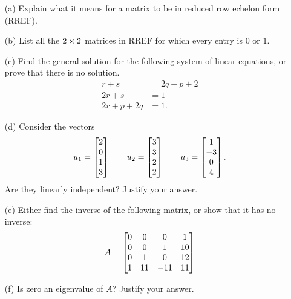 \documentclass[a4paper]{article}
\begin{document}
\begin{problem}[2012-13 resit]
\[ \]
 \begin{itemize}
  \item[(a)] Explain what it means for a matrix to be in reduced row
   echelon form (RREF). 
  \item[(b)] List all the $2\times 2$ matrices in RREF for which every
   entry is $0$ or $1$.  
  \item[(c)] Find the general solution for the following system of
   linear equations, or prove that there is no solution. 
   \begin{align*}
    r + s &= 2q+p+2 \\
    2r+s &= 1 \\
    2r+p+2q &= 1.
   \end{align*}
  \item[(d)] Consider the vectors
   \[
    u_1 = \left[\begin{matrix} 2\\0\\1\\3\end{matrix}\right] \qquad
    u_2 = \left[\begin{matrix} 3\\3\\2\\2 \end{matrix}\right] \qquad
    u_3 = \left[\begin{matrix} 1\\ -3\\ 0\\ 4\end{matrix}\right].
   \]
   Are they linearly independent?  Justify your answer. 
  \item[(e)] Either find the inverse of the following matrix, or show
   that it has no inverse: 
   \[ A = \left[\begin{matrix}
           0&0&0&1\\
           0&0&1&10\\
           0&1&0&12\\
           1&11&-11&11\\
          \end{matrix}\right]
   \]
  \item[(f)] Is zero an eigenvalue of $A$?  Justify your answer.  
 \end{itemize}
\end{problem}
\end{document}
